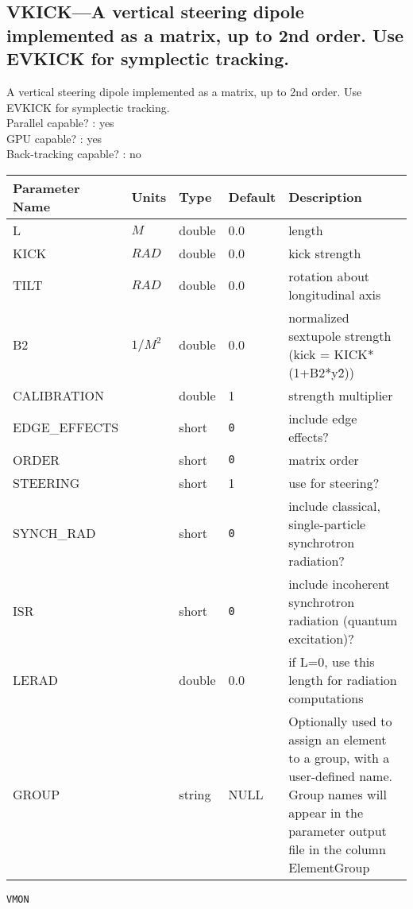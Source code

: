 \subsection{VKICK---A vertical steering dipole implemented as a matrix, up to 2nd order. Use EVKICK for symplectic tracking.}
A vertical steering dipole implemented as a matrix, up to 2nd order. Use EVKICK for symplectic tracking.
\\
Parallel capable? : yes\\
GPU capable? : yes\\
Back-tracking capable? : no\\
\begin{tabular}{|l|l|l|l|p{\descwidth}|} \hline
Parameter Name & Units & Type & Default & Description \\ \hline 
L & $M$ & double &  0.0 & length  \\ \hline 
KICK & $RAD$ & double &  0.0 & kick strength  \\ \hline 
TILT & $RAD$ & double &  0.0 & rotation about longitudinal axis  \\ \hline 
B2 & $1/M^{2}$ & double &  0.0 & normalized sextupole strength (kick = KICK*(1+B2*y\^2))  \\ \hline 
CALIBRATION &  & double &   1 & strength multiplier  \\ \hline 
EDGE\_EFFECTS &  & short &  \verb|0| & include edge effects?  \\ \hline 
ORDER &  & short &  \verb|0| & matrix order  \\ \hline 
STEERING &  & short &   1               & use for steering?  \\ \hline 
SYNCH\_RAD &  & short &  \verb|0| & include classical, single-particle synchrotron radiation?  \\ \hline 
ISR &  & short &  \verb|0| & include incoherent synchrotron radiation (quantum excitation)?  \\ \hline 
LERAD &  & double &  0.0 & if L=0, use this length for radiation computations  \\ \hline 
GROUP &  & string & NULL & Optionally used to assign an element to a group, with a user-defined name.  Group names will appear in the parameter output file in the column ElementGroup  \\ \hline 
\end{tabular}

\newpage
\begin{center}{\Large\verb|VMON|}\end{center}
